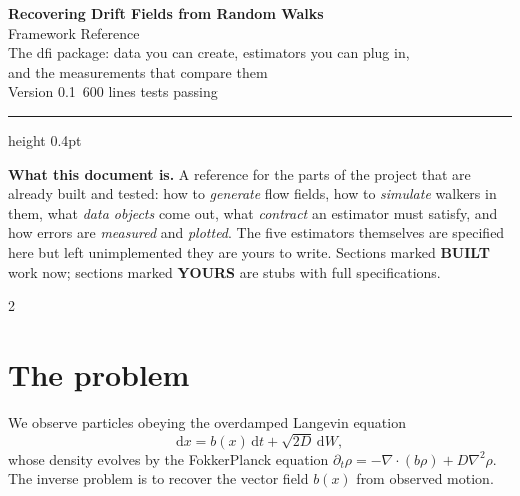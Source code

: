 \documentclass[11pt,a4paper]{article}
\newcommand{\code}[1]{{\ttfamily\small #1}}
\newcommand{\yours}{{\color{accent2}\footnotesize\bfseries YOURS}}
\newcommand{\built}{{\color{aqua}\footnotesize\bfseries BUILT}}
\begin{document}
\begin{center}
{\LARGE\bfseries\color{ink} Recovering Drift Fields from Random Walks}\\[0.35em]
{\Large\color{accent} Framework Reference}\\[1.0em]
{\color{ink2}\large The \code{dfi} package: data you can create, estimators you can plug in,\\
and the measurements that compare them}\\[1.2em]
{\color{ink3}\small Version 0.1 \quad\textbullet{}\,600 lines \quad\textbullet{} tests passing}
\end{center}

\vspace{0.6em}
\hrule height 0.4pt \vspace{1.2em}

\begin{keybox}
\textbf{What this document is.} A reference for the parts of the project that are
already built and tested: how to \emph{generate} flow fields, how to \emph{simulate}
walkers in them, what \emph{data objects} come out, what \emph{contract} an estimator
must satisfy, and how errors are \emph{measured} and \emph{plotted}. The five
estimators themselves are specified here but left unimplemented \textemdash{} they are
yours to write. Sections marked \built{} work now; sections marked \yours{} are stubs
with full specifications.
\end{keybox}

\vspace{0.4em}
{\small\color{ink2}
\setlength{\parskip}{0pt}
\begin{multicols}{2}
\tableofcontents
\end{multicols}}

\clearpage

\section{The problem}

We observe particles obeying the overdamped Langevin equation
\begin{equation}
  \mathrm{d}x = b(x)\,\mathrm{d}t + \sqrt{2D}\,\mathrm{d}W ,
  \label{eq:sde}
\end{equation}
whose density evolves by the Fokker\textendash{}Planck equation
$\partial_t\rho = -\nabla\!\cdot\!(b\rho) + D\nabla^2\rho$.
The inverse problem is to recover the vector field $b(x)$ from observed motion.
\end{document}
